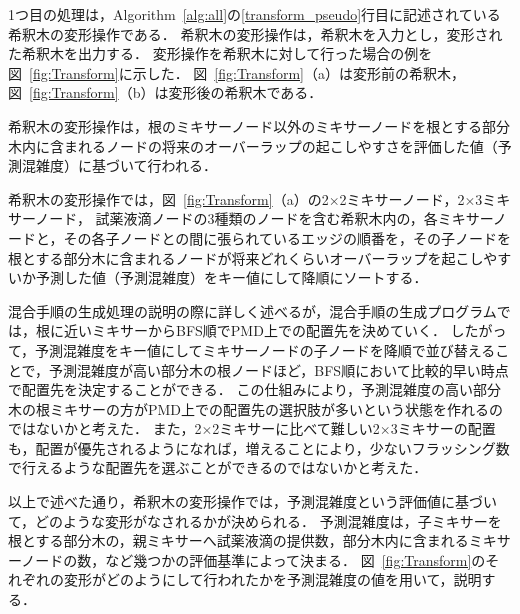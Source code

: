 1つ目の処理は，Algorithm~\ref{alg:all}の\ref{transform_pseudo}行目に記述されている希釈木の変形操作である．
希釈木の変形操作は，希釈木を入力とし，変形された希釈木を出力する．
変形操作を希釈木に対して行った場合の例を図~\ref{fig:Transform}に示した．
図~\ref{fig:Transform}（a）は変形前の希釈木，図~\ref{fig:Transform}（b）は変形後の希釈木である．

希釈木の変形操作は，根のミキサーノード以外のミキサーノードを根とする部分木内に含まれるノードの将来のオーバーラップの起こしやすさを評価した値（予測混雑度）に基づいて行われる．

希釈木の変形操作では，図~\ref{fig:Transform}（a）の2$\times$2ミキサーノード，2$\times$3ミキサーノード，
試薬液滴ノードの3種類のノードを含む希釈木内の，各ミキサーノードと，その各子ノードとの間に張られているエッジの順番を，その子ノードを根とする部分木に含まれるノードが将来どれくらいオーバーラップを起こしやすいか予測した値（予測混雑度）をキー値にして降順にソートする． 

混合手順の生成処理の説明の際に詳しく述べるが，混合手順の生成プログラムでは，根に近いミキサーからBFS順でPMD上での配置先を決めていく．
したがって，予測混雑度をキー値にしてミキサーノードの子ノードを降順で並び替えることで，予測混雑度が高い部分木の根ノードほど，BFS順において比較的早い時点で配置先を決定することができる．
この仕組みにより，予測混雑度の高い部分木の根ミキサーの方がPMD上での配置先の選択肢が多いという状態を作れるのではないかと考えた．
また，2$\times$2ミキサーに比べて難しい2$\times$3ミキサーの配置も，配置が優先されるようになれば，増えることにより，少ないフラッシング数で行えるような配置先を選ぶことができるのではないかと考えた．

以上で述べた通り，希釈木の変形操作では，予測混雑度という評価値に基づいて，どのような変形がなされるかが決められる．
予測混雑度は，子ミキサーを根とする部分木の，親ミキサーへ試薬液滴の提供数，部分木内に含まれるミキサーノードの数，など幾つかの評価基準によって決まる．
図~\ref{fig:Transform}のそれぞれの変形がどのようにして行われたかを予測混雑度の値を用いて，説明する．

